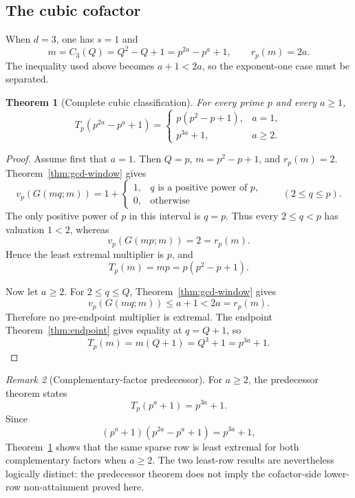 \documentclass[11pt]{article}
\newtheorem{theorem}{Theorem}[section]
\theoremstyle{definition}
\theoremstyle{remark}
\newtheorem{remark}[theorem]{Remark}
\begin{document}
\subsection{The cubic cofactor}

When \(d=3\), one has \(s=1\) and
\[
  m=C_3(Q)=Q^2-Q+1=p^{2a}-p^a+1,
  \qquad
  r_p(m)=2a.
\]
The inequality used above becomes \(a+1<2a\), so the exponent-one case must be
separated.

\begin{theorem}[Complete cubic classification]\label{thm:mainC}
For every prime \(p\) and every \(a\ge1\),
\[
  T_p(p^{2a}-p^a+1)
  =
  \begin{cases}
    p(p^2-p+1),&a=1,\\
    p^{3a}+1,&a\ge2.
  \end{cases}
\]
\end{theorem}

\begin{proof}
Assume first that \(a=1\).  Then \(Q=p\), \(m=p^2-p+1\), and
\(r_p(m)=2\).  Theorem~\ref{thm:gcd-window} gives
\[
  v_p(G(mq;m))
  =
  1+
  \begin{cases}
    1,&q\text{ is a positive power of }p,\\
    0,&\text{otherwise}
  \end{cases}
  \qquad(2\le q\le p).
\]
The only positive power of \(p\) in this interval is \(q=p\).  Thus every
\(2\le q<p\) has valuation \(1<2\), whereas
\[
  v_p(G(mp;m))=2=r_p(m).
\]
Hence the least extremal multiplier is \(p\), and
\[
  T_p(m)=mp=p(p^2-p+1).
\]

Now let \(a\ge2\).  For \(2\le q\le Q\), Theorem~\ref{thm:gcd-window} gives
\[
  v_p(G(mq;m))\le a+1<2a=r_p(m).
\]
Therefore no pre-endpoint multiplier is extremal.  The endpoint
Theorem~\ref{thm:endpoint} gives equality at \(q=Q+1\), so
\[
  T_p(m)=m(Q+1)=Q^3+1=p^{3a}+1.
\]
\end{proof}

\begin{remark}[Complementary-factor predecessor]\label{rem:complementary}
For \(a\ge2\), the predecessor theorem \cite{FairfaxBallExtremes2026} states
\[
  T_p(p^a+1)=p^{3a}+1.
\]
Since
\[
  (p^a+1)(p^{2a}-p^a+1)=p^{3a}+1,
\]
Theorem~\ref{thm:mainC} shows that the same sparse row is least extremal for
both complementary factors when \(a\ge2\).  The two least-row results are
nevertheless logically distinct: the predecessor theorem does not imply the
cofactor-side lower-row non-attainment proved here.
\end{remark}
\end{document}
